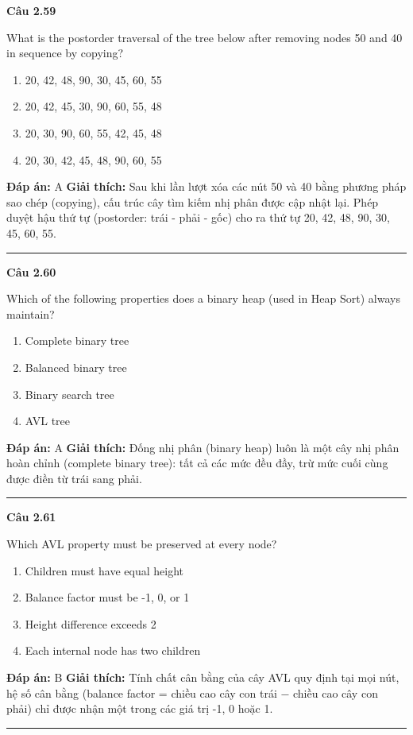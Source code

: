 \documentclass[11pt,a4paper]{article}
\newenvironment{question}[1]{%
  \par\vspace{1em}\noindent\textbf{\large Câu #1}\par\vspace{0.4em}
}{%
  \par\vspace{1em}\hrule\vspace{0.6em}
}
\newenvironment{choices}{%
  \begin{enumerate}[label=\textbf{\Alph*.},leftmargin=2.2em,itemsep=2pt,topsep=3pt]
}{%
  \end{enumerate}
}
\newcommand{\choice}{\item}
\begin{document}
\begin{question}{2.59}
What is the postorder traversal of the tree below after removing nodes 50 and 40 in sequence by copying?
\begin{center}
\end{center}
\begin{choices}
\choice 20, 42, 48, 90, 30, 45, 60, 55
\choice 20, 42, 45, 30, 90, 60, 55, 48
\choice 20, 30, 90, 60, 55, 42, 45, 48
\choice 20, 30, 42, 45, 48, 90, 60, 55
\end{choices}
\textbf{Đáp án:} A
\textbf{Giải thích:} Sau khi lần lượt xóa các nút 50 và 40 bằng phương pháp sao chép (copying), cấu trúc cây tìm kiếm nhị phân được cập nhật lại. Phép duyệt hậu thứ tự (postorder: trái - phải - gốc) cho ra thứ tự 20, 42, 48, 90, 30, 45, 60, 55.
\end{question}

\begin{question}{2.60}
Which of the following properties does a binary heap (used in Heap Sort) always maintain?
\begin{choices}
\choice Complete binary tree
\choice Balanced binary tree
\choice Binary search tree
\choice AVL tree
\end{choices}
\textbf{Đáp án:} A
\textbf{Giải thích:} Đống nhị phân (binary heap) luôn là một cây nhị phân hoàn chỉnh (complete binary tree): tất cả các mức đều đầy, trừ mức cuối cùng được điền từ trái sang phải.
\end{question}

\begin{question}{2.61}
Which AVL property must be preserved at every node?
\begin{choices}
\choice Children must have equal height
\choice Balance factor must be -1, 0, or 1
\choice Height difference exceeds 2
\choice Each internal node has two children
\end{choices}
\textbf{Đáp án:} B
\textbf{Giải thích:} Tính chất cân bằng của cây AVL quy định tại mọi nút, hệ số cân bằng (balance factor = chiều cao cây con trái − chiều cao cây con phải) chỉ được nhận một trong các giá trị -1, 0 hoặc 1.
\end{question}
\end{document}
